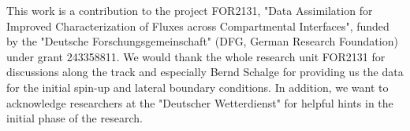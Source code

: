 \documentclass[HESSD, manuscript]{copernicus}
\begin{document}

\begin{acknowledgements}
	This work is a contribution to the project FOR2131, "Data Assimilation for Improved Characterization of Fluxes across Compartmental Interfaces", funded by the
	"Deutsche Forschungsgemeinschaft" (DFG, German Research
	Foundation) under grant 243358811.
	We would thank the whole research unit FOR2131 for discussions along the track and especially Bernd Schalge for providing us the data for the initial spin-up and lateral boundary conditions.
	In addition, we want to acknowledge researchers at the "Deutscher Wetterdienst" for helpful hints in the initial phase of the research.
\end{acknowledgements}



\end{document}
